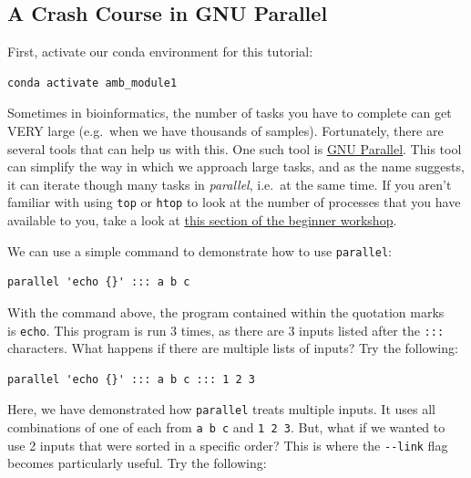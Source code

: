 \documentclass[
]{book}
\begin{document}
\subsection{A Crash Course in GNU Parallel}\label{a-crash-course-in-gnu-parallel}

First, activate our conda environment for this tutorial:

\begin{verbatim}
conda activate amb_module1
\end{verbatim}

Sometimes in bioinformatics, the number of tasks you have to complete can get VERY large (e.g.~when we have thousands of samples). Fortunately, there are several tools that can help us with this. One such tool is \href{https://www.gnu.org/software/parallel/parallel_tutorial.html}{GNU Parallel}. This tool can simplify the way in which we approach large tasks, and as the name suggests, it can iterate though many tasks in \emph{parallel}, i.e.~at the same time. If you aren't familiar with using \texttt{top} or \texttt{htop} to look at the number of processes that you have available to you, take a look at \href{https://github.com/LangilleLab/microbiome_helper/wiki/CBW\%E2\%80\%902025\%E2\%80\%90BMB\%E2\%80\%90Module1\#113-htop---looking-at-the-number-of-processes-we-have-available-or-running}{this section of the beginner workshop}.

We can use a simple command to demonstrate how to use \texttt{parallel}:

\begin{verbatim}
parallel 'echo {}' ::: a b c
\end{verbatim}

With the command above, the program contained within the quotation marks \texttt{\textquotesingle{}\ \textquotesingle{}} is \texttt{echo}. This program is run 3 times, as there are 3 inputs listed after the \texttt{:::} characters. What happens if there are multiple lists of inputs? Try the following:

\begin{verbatim}
parallel 'echo {}' ::: a b c ::: 1 2 3
\end{verbatim}

Here, we have demonstrated how \texttt{parallel} treats multiple inputs. It uses all combinations of one of each from \texttt{a\ b\ c} and \texttt{1\ 2\ 3}. But, what if we wanted to use 2 inputs that were sorted in a specific order? This is where the \texttt{-\/-link} flag becomes particularly useful. Try the following:
\end{document}

